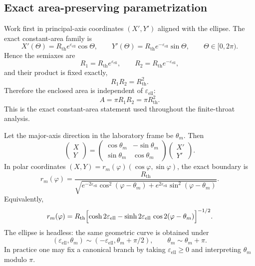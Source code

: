 \documentclass[11pt]{article}
\theoremstyle{plain}
\theoremstyle{definition}
\theoremstyle{remark}
\newcommand{\Rth}{R_{\mathrm{th}}}
\newcommand{\epsell}{\varepsilon_{\mathrm{ell}}}
\newcommand{\thmouth}{\theta_m}
\begin{document}
\subsection{Exact area-preserving parametrization}\label{subsec:ellipse-parametrization}

Work first in principal-axis coordinates \((X',Y')\) aligned with the ellipse. The exact constant-area family is
\begin{equation}
X'(\Theta)=\Rth e^{\epsell}\cos\Theta,
\qquad
Y'(\Theta)=\Rth e^{-\epsell}\sin\Theta,
\qquad
\Theta\in[0,2\pi).
\label{eq:ellipse-principal-param}
\end{equation}
Hence the semiaxes are
\begin{equation}
R_1=\Rth e^{\epsell},
\qquad
R_2=\Rth e^{-\epsell},
\label{eq:ellipse-semiaxes-appendix}
\end{equation}
and their product is fixed exactly,
\begin{equation}
R_1R_2=\Rth^2.
\label{eq:ellipse-semiaxes-product}
\end{equation}
Therefore the enclosed area is independent of \(\epsell\):
\begin{equation}
A=\pi R_1R_2=\pi\Rth^2.
\label{eq:ellipse-area-exact}
\end{equation}
This is the exact constant-area statement used throughout the finite-throat analysis.

Let the major-axis direction in the laboratory frame be \(\thmouth\). Then
\begin{equation}
\begin{pmatrix} X \\ Y \end{pmatrix}
=
\begin{pmatrix}
\cos\thmouth & -\sin\thmouth \\
\sin\thmouth & \cos\thmouth
\end{pmatrix}
\begin{pmatrix} X' \\ Y' \end{pmatrix}.
\label{eq:ellipse-lab-rotation}
\end{equation}
In polar coordinates \((X,Y)=r_m(\varphi)(\cos\varphi,\sin\varphi)\), the exact boundary is
\begin{equation}
r_m(\varphi)
=
\frac{\Rth}{\sqrt{e^{-2\epsell}\cos^2(\varphi-\thmouth)+e^{2\epsell}\sin^2(\varphi-\thmouth)}}.
\label{eq:ellipse-polar-boundary}
\end{equation}
Equivalently,
\begin{equation}
r_m(\varphi)
=
\Rth\Bigl[\cosh 2\epsell-\sinh 2\epsell\,\cos 2(\varphi-\thmouth)\Bigr]^{-1/2}.
\label{eq:ellipse-polar-boundary-hyperbolic}
\end{equation}
The ellipse is headless: the same geometric curve is obtained under
\begin{equation}
(\epsell,\thmouth)\sim(-\epsell,\thmouth+\pi/2),
\qquad
\thmouth\sim\thmouth+\pi.
\label{eq:ellipse-headless-identification}
\end{equation}
In practice one may fix a canonical branch by taking \(\epsell\ge 0\) and interpreting \(\thmouth\) modulo \(\pi\).
\end{document}
